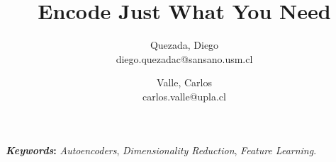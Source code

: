 \documentclass[twocolumn]{article}
\title{\textbf{Encode Just What You Need}}
\author{Quezada, Diego \\ diego.quezadac@sansano.usm.cl \and Valle, Carlos \\ carlos.valle@upla.cl}
\begin{document}
\sloppy %

\maketitle



\textbf{\textit{Keywords}:} \textit{Autoencoders}, \textit{Dimensionality Reduction}, \textit{Feature Learning}.



% 



% 

% 

% 

\newpage


\end{document}

